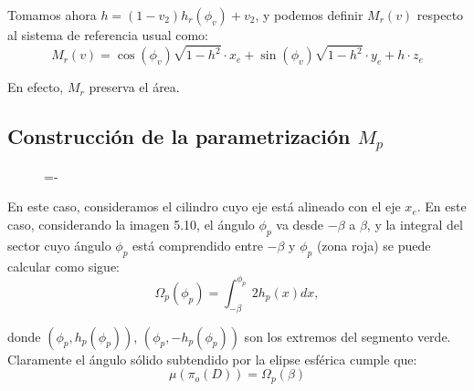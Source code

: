 Tomamos ahora $h = (1-v_2)h_r(\phi_v) + v_2$, y podemos definir $M_r(v)$ respecto al sistema de referencia usual como:
$$M_r(v) = \cos(\phi_v)\sqrt{1-h^2}\cdot x_e +\sin(\phi_v)\sqrt{1-h^2}\cdot y_e +h\cdot z_e$$

En efecto, $M_r$ preserva el área.

\subsection{Construcción de la parametrización $M_p$}

\begin{figure}[h]
  \lineskip=-\fboxrule
\end{figure}

En este caso, consideramos el cilindro cuyo eje está alineado con el eje $x_e$. En este caso, considerando la imagen 5.10, el ángulo $\phi_p$ va desde $-\beta$ a $\beta$, y la integral del sector cuyo ángulo $\phi_p$ está comprendido entre $-\beta$ y $\phi_p$ (zona roja) se puede calcular como sigue:
$$\Omega_p(\phi_p)=\int_{-\beta}^{\phi_p}2h_p(x)dx,$$

donde $(\phi_p, h_p(\phi_p))$, $(\phi_p, -h_p(\phi_p))$ son los extremos del segmento verde. Claramente el ángulo sólido subtendido por la elipse esférica cumple que:
$$\mu(\pi_o(D)) = \Omega_p(\beta)$$

